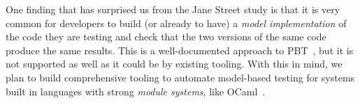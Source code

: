

One finding that has surprised us from the Jane Street study is that
it is {very} common for developers to build (or already to have) a
{\em model
implementation} of the code they are testing and check that the two versions of
the same code produce the same results.  This is a well-documented approach to
PBT~\cite{hughes_experiences_2016}, but it is not supported as well as it could
be by existing tooling.
%
With this in mind, we plan to build comprehensive tooling to automate
model-based testing for systems built in languages with strong {\em
  module systems}, like OCaml~\cite{macqueen_modules_1984}.

